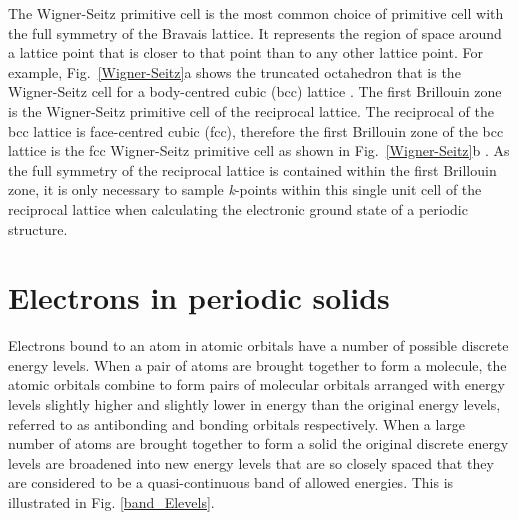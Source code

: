 \documentclass[11pt, twoside]{report}
\begin{document}
The Wigner-Seitz primitive cell is the most common choice of primitive cell with the full symmetry of the Bravais lattice. It represents the region of space around a lattice point  that is closer to that point than to any other lattice point. For example, Fig.~\ref{Wigner-Seitz}a shows the truncated octahedron that is the Wigner-Seitz cell for a body-centred cubic (bcc) lattice \cite{AshcroftMermin2}.
The first Brillouin zone is the Wigner-Seitz primitive cell of the reciprocal lattice. The reciprocal of the bcc lattice is face-centred cubic (fcc), therefore the first Brillouin zone of the bcc lattice is the fcc Wigner-Seitz primitive cell as shown in Fig.~\ref{Wigner-Seitz}b \cite{AshcroftMermin3}. As the full symmetry of the reciprocal lattice is contained within the first Brillouin zone, it is only necessary to sample \textit{k}-points within this single unit cell of the reciprocal lattice when calculating the electronic ground state of a periodic structure.



\section{Electrons in periodic solids}\label{BandTheorySection}


Electrons bound to an atom in atomic orbitals have a number of possible discrete energy levels. When a pair of atoms are brought together to form a molecule, the atomic orbitals combine to form pairs of molecular orbitals arranged with energy levels slightly higher and slightly lower in energy than the original energy levels, referred to as antibonding and bonding orbitals respectively. When a large number of atoms are brought together to form a solid the 
original discrete energy levels are broadened into new energy levels that are so closely spaced that they are considered to be a quasi-continuous band of allowed energies. This is illustrated in Fig. \ref{band_Elevels}. 
\end{document}
